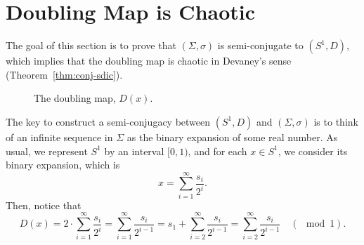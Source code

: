 \documentclass[10pt,twoside]{book}
\begin{document}
\section{Doubling Map is Chaotic}
The goal of this section is to prove that $(\Sigma, \sigma)$ is semi-conjugate to $(S^1, D)$, which implies that the doubling map is chaotic in Devaney's sense (Theorem~\ref{thm:conj-sdic}).
\begin{center}
\end{center}
\begin{figure}[ht]
  \centering
  \label{fig:doubling}
  \caption{The doubling map, $D(x)$.}
\end{figure}
The key to construct a semi-conjugacy between $(S^1,D)$ and $(\Sigma, \sigma)$ is to think of an infinite sequence in $\Sigma$ as the binary expansion of some real number.
As usual, we represent $S^1$ by an interval $[0,1)$, and for each $x \in S^1$, we consider its binary expansion, which is %
\begin{equation*}
  x = \sum\limits_{i = 1}^{\infty} \frac{s_i}{2^i}.
\end{equation*}
Then, notice that
\begin{equation*}
  D(x) = 2 \cdot \sum\limits_{i = 1}^{\infty} \frac{s_i}{2^i}
  = \sum\limits_{i = 1}^{\infty} \frac{s_i}{2^{i-1}}
  = s_1 + \sum\limits_{i = 2}^{\infty} \frac{s_i}{2^{i-1}}
  = \sum\limits_{i = 2}^{\infty} \frac{s_i}{2^{i-1}}
  \quad(\mod{1}).
\end{equation*}
\end{document}
